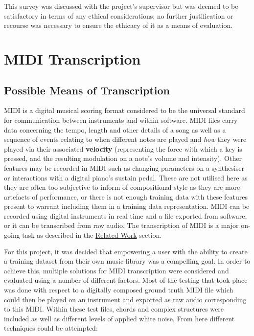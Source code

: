 \documentclass[12pt,]{article}
\begin{document}
This survey was discussed with the project's supervisor but was deemed
to be satisfactory in terms of any ethical considerations; no further
justification or recourse was necessary to ensure the ethicacy of it as
a means of evaluation.

\hypertarget{midi-transcription}{%
\section{MIDI Transcription}\label{midi-transcription}}

\hypertarget{possible-means-of-transcription}{%
\subsection{Possible Means of
Transcription}\label{possible-means-of-transcription}}

MIDI is a digital musical scoring format considered to be the universal
standard for communication between instruments and within software. MIDI
files carry data concerning the tempo, length and other details of a
song as well as a sequence of events relating to when different notes
are played and \emph{how} they were played via their associated
\textbf{velocity} (representing the force with which a key is pressed,
and the resulting modulation on a note's volume and intensity). Other
features may be recorded in MIDI such as changing parameters on a
synthesiser or interactions with a digital piano's sustain pedal. These
are not utilised here as they are often too subjective to inform of
compositional style as they are more artefacts of performance, or there
is not enough training data with these features present to warrant
including them in a training data representation. MIDI can be recorded
using digital instruments in real time and a file exported from
software, or it can be transcribed from raw audio. The transcription of
MIDI is a major on-going task as described in the
\protect\hyperlink{relatedwork}{Related Work} section.

For this project, it was decided that empowering a user with the ability
to create a training dataset from their own music library was a
compelling goal. In order to achieve this, multiple solutions for MIDI
transcription were considered and evaluated using a number of different
factors. Most of the testing that took place was done with respect to a
digitally composed ground truth MIDI file which could then be played on
an instrument and exported as raw audio corresponding to this MIDI.
Within these test files, chords and complex structures were included as
well as different levels of applied white noise. From here different
techniques could be attempted:
\end{document}
